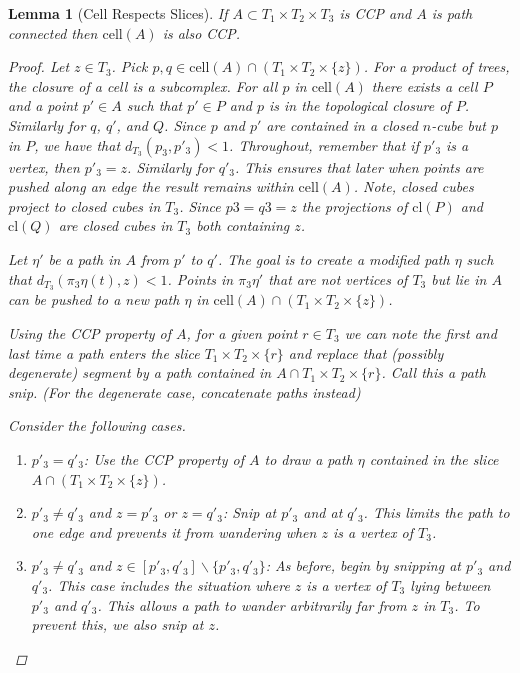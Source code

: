 \documentclass[12pt,parskip=full]{report}
\theoremstyle{plain}
\newtheorem{lem}[thm]{Lemma}
\theoremstyle{definition}
\begin{document}
\begin{lem}
    [Cell Respects Slices]
    \label{lem:cellrespecslice} 
    If $A\subset T_1\times T_2\times T_3$ is CCP and \(A\) is path connected then $\text{cell}(A)$ is also CCP.

    \begin{proof}
        Let \(z\in T_3\). Pick \(p,q\in \text{cell}(A)\cap (T_1\times T_2\times \{z\})\). For a product of trees, the closure of a cell is a subcomplex. For all \(p\) in \(\text{cell}(A)\) there exists a cell \(P\) and a point \(p'\in A\) such that \(p' \in P\) and \(p\) is in the topological closure of \(P\). Similarly for \(q\), \(q'\), and \(Q\). Since \(p\) and \(p'\) are contained in a closed \(n\)-cube but \(p\) in \(P\), we have that \(d_{T_3}(p_3,p'_3)<1\). Throughout, remember that if \(p'_3\) is a vertex, then \(p'_3 = z\). Similarly for \(q'_3\). This ensures that later when points are pushed along an edge the result remains within \(\text{cell}(A)\).  Note, closed cubes project to closed cubes in \(T_3\). Since \(p3=q3=z\) the projections of \(\text{cl}(P)\) and \(\text{cl}(Q)\) are closed cubes in \(T_3\) both containing \(z\).
        
        Let $\eta'$ be a path in \(A\) from \(p'\) to \(q'\). The goal is to create a modified path \(\eta\) such that \(d_{T_3}(\pi_3\eta(t), z) <1\). Points in \(\pi_3\eta'\) that are not vertices of \(T_3\) but lie in \(A\) can be pushed to a new path \(\eta\) in \(\text{cell}(A)\cap(T_1\times T_2\times \{z\})\). 
        
        Using the CCP property of \(A\), for a given point \(r\in T_3\) we can note the first and last time a path enters the slice \(T_1\times T_2\times \{r\}\) and replace that (possibly degenerate) segment by a path contained in \(A\cap T_1\times T_2\times \{r\}\). Call this a path snip. (For the degenerate case, concatenate paths instead)
        
        Consider the following cases.
        \begin{enumerate}
            \item \(p'_3=q'_3\): Use the CCP property of \(A\) to draw a path \(\eta\) contained in the slice \(A\cap (T_1\times T_2\times \{z\})\).
            \item \(p'_3\neq q'_3\) and \(z=p'_3\) or \(z=q'_3\): Snip at \(p'_3\) and at \(q'_3\). This limits the path to one edge and prevents it from wandering when \(z\) is a vertex of \(T_3\).
            \item \(p'_3\neq q'_3\) and \(z\in [p'_3,q'_3]\smallsetminus\{p'_3,q'_3\}\): As before, begin by snipping at \(p'_3\) and \(q'_3\). This case includes the situation where \(z\) is a vertex of \(T_3\) lying between \(p'_3\) and \(q'_3\). This allows a path to wander arbitrarily far from \(z\) in \(T_3\). To prevent this, we also snip at \(z\).
        \end{enumerate}


\end{proof}
\end{lem}
\end{document}
